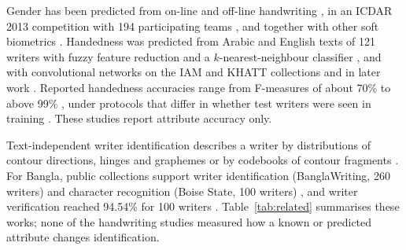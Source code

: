 \documentclass[conference,a4paper]{IEEEtran}
\begin{document}
Gender has been predicted from on-line and off-line handwriting \cite{liwicki2011gender,siddiqi2015gender}, in an ICDAR 2013 competition with 194 participating teams \cite{hassaine2013icdar}, and together with other soft biometrics \cite{bouadjenek2016soft}. Handedness was predicted from Arabic and English texts of 121 writers with fuzzy feature reduction and a $k$-nearest-neighbour classifier \cite{almaadeed2016handedness}, and with convolutional networks on the IAM and KHATT collections \cite{morera2018handedness} and in later work \cite{rahmanian2021handedness}. Reported handedness accuracies range from F-measures of about 70\% \cite{almaadeed2016handedness} to above 99\% \cite{rahmanian2021handedness}, under protocols that differ in whether test writers were seen in training \cite{anon2026handedness}. These studies report attribute accuracy only.

Text-independent writer identification describes a writer by distributions of contour directions, hinges and graphemes \cite{bulacu2007text} or by codebooks of contour fragments \cite{schomaker2007codebooks}. For Bangla, public collections support writer identification (BanglaWriting, 260 writers) \cite{mridha2021banglawriting} and character recognition (Boise State, 100 writers) \cite{majid2018bangla}, and writer verification reached 94.54\% for 100 writers \cite{paul2024bangla}. Table~\ref{tab:related} summarises these works; none of the handwriting studies measured how a known or predicted attribute changes identification.
\end{document}

